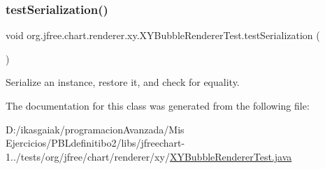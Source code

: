 \subsubsection{\texorpdfstring{test\+Serialization()}{testSerialization()}}
{\footnotesize\ttfamily void org.\+jfree.\+chart.\+renderer.\+xy.\+X\+Y\+Bubble\+Renderer\+Test.\+test\+Serialization (\begin{DoxyParamCaption}{ }\end{DoxyParamCaption})}

Serialize an instance, restore it, and check for equality. 

The documentation for this class was generated from the following file\+:\begin{DoxyCompactItemize}
\item 
D\+:/ikasgaiak/programacion\+Avanzada/\+Mis Ejercicios/\+P\+B\+Ldefinitibo2/libs/jfreechart-\/1../tests/org/jfree/chart/renderer/xy/\mbox{\hyperlink{_x_y_bubble_renderer_test_8java}{X\+Y\+Bubble\+Renderer\+Test.\+java}}\end{DoxyCompactItemize}
